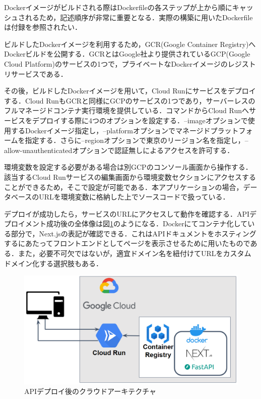           \par Dockerイメージがビルドされる際はDockerfileの各ステップが上から順にキャッシュされるため，記述順序が非常に重要となる．実際の構築に用いたDockerfileは付録を参照されたい．
          \par ビルドしたDockerイメージを利用するため，GCR(Google Container Registry)へDockerビルドを公開する．GCRとはGoogle社より提供されているGCP(Google Cloud Platform)のサービスの1つで，プライベートなDockerイメージのレジストリサービスである．
          \par その後，ビルドしたDockerイメージを用いて，Cloud Runにサービスをデプロイする．Cloud RunもGCRと同様にGCPのサービスの1つであり，サーバーレスのフルマネージドコンテナ実行環境を提供している．コマンドからCloud Runへサービスをデプロイする際に4つのオプションを設定する．--imageオプションで使用するDockerイメージ指定し，--platformオプションでマネージドプラットフォームを指定する．さらに--regionオプションで東京のリージョン名を指定し，--allow-unauthenticatedオプションで認証無しによるアクセスを許可する．
          \par 環境変数を設定する必要がある場合は別GCPのコンソール画面から操作する．該当するCloud Runサービスの編集画面から環境変数セクションにアクセスすることができるため，そこで設定が可能である．本アプリケーションの場合，データベースのURLを環境変数に格納した上でソースコードで扱っている．
          \par デプロイが成功したら，サービスのURLにアクセスして動作を確認する．APIデプロイメント成功後の全体像は図\ref{fig:APIデプロイ後のクラウドアーキテクチャ}のようになる．Dockerにてコンテナ化している部分で，Next.jsの表記が確認できる．これはAPIドキュメントをホスティングするにあたってフロントエンドとしてページを表示させるために用いたものである．また，必要不可欠ではないが，適宜ドメイン名を紐付けてURLをカスタムドメイン化する選択肢もある．

          \begin{figure}[htbp]
            \centering
            \includegraphics[scale=0.28]
            {figures/TechStack.png}
            \caption{APIデプロイ後のクラウドアーキテクチャ}
            \label{fig:APIデプロイ後のクラウドアーキテクチャ}
          \end{figure}

